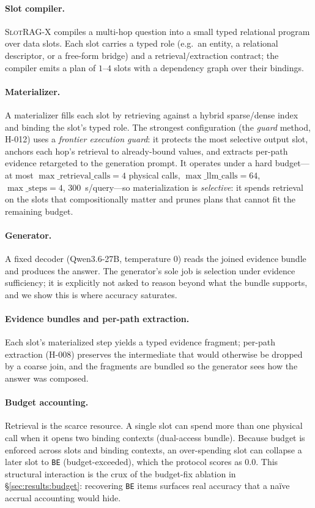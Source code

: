 \paragraph{Slot compiler.}  \textsc{SlotRAG-X} compiles a multi-hop question
into a small typed relational program over data slots. Each slot carries a
typed role (e.g.\ an entity, a relational descriptor, or a free-form bridge)
and a retrieval/extraction contract; the compiler emits a plan of $1$--$4$
slots with a dependency graph over their bindings.

\paragraph{Materializer.}  A materializer fills each slot by retrieving
against a hybrid sparse/dense index and binding the slot's typed role. The
strongest configuration (the \emph{guard} method, H-012) uses a
\emph{frontier execution guard}: it protects the most selective output slot,
anchors each hop's retrieval to already-bound values, and extracts per-path
evidence retargeted to the generation prompt. It operates under a hard
budget---at most $\max\_\mathrm{retrieval\_calls}=4$ physical calls, $\max\_
\mathrm{llm\_calls}=64$, $\max\_\mathrm{steps}=4$, $300$~s/query---so
materialization is \emph{selective}: it spends retrieval on the slots that
compositionally matter and prunes plans that cannot fit the remaining budget.

\paragraph{Generator.}  A fixed decoder (Qwen3.6-27B, temperature $0$) reads
the joined evidence bundle and produces the answer. The generator's sole job
is selection under evidence sufficiency; it is explicitly not asked to reason
beyond what the bundle supports, and we show this is where accuracy saturates.

\paragraph{Evidence bundles and per-path extraction.}  Each slot's materialized
step yields a typed evidence fragment; per-path extraction (H-008) preserves
the intermediate that would otherwise be dropped by a coarse join, and the
fragments are bundled so the generator sees how the answer was composed.

\paragraph{Budget accounting.}  Retrieval is the scarce resource. A single
slot can spend more than one physical call when it opens two binding contexts
(dual-access bundle). Because budget is enforced across slots and binding
contexts, an over-spending slot can collapse a later slot to \texttt{BE}
(budget-exceeded), which the protocol scores as $0.0$. This structural
interaction is the crux of the budget-fix ablation in \S\ref{sec:results:budget}:
recovering \texttt{BE} items surfaces real accuracy that a naïve accrual
accounting would hide.
